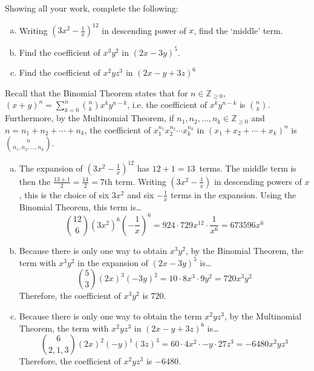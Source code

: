 \documentclass[11pt,letterpaper]{article}
\begin{document}

 Showing all your work, complete the following:
	\begin{enumerate}[(a)]
	\item Writing $\left(3x^2 - \frac{1}{x} \right)^{12}$ in descending power of $x$, find the `middle' term. 
	\item Find the coefficient of $x^3y^2$ in $(2x - 3y)^5$.
	\item Find the coefficient of $x^2yz^3$ in $(2x - y + 3z)^6$
	\end{enumerate} \pspace

\sol 

Recall that the Binomial Theorem states that for $n \in \mathbb{Z}_{\geq 0}$, $(x + y)^n= \sum_{k=0}^n \binom{n}{k} x^k y^{n - k}$, i.e. the coefficient of $x^k y^{n - k}$ is $\binom{n}{k}$. Furthermore, by the Multinomial Theorem, if $n_1, n_2, \ldots, n_k \in \mathbb{Z}_{\geq 0}$ and $n= n_1 + n_2 + \cdots + n_k$, the coefficient of $x_1^{n_1} x_2^{n_2} \cdots x_k^{n_k}$ in $(x_1 + x_2 + \cdots + x_k)^n$ is $\binom{n}{n_1, n_2, \ldots, n_k}$. 

\begin{enumerate}[(a)]
\item The expansion of $(3x^2 - \frac{1}{x})^{12}$ has $12 + 1= 13$~terms. The middle term is then the $\frac{13 + 1}{2}= \frac{14}{2}= 7$th term. Writing $(3x^2 - \frac{1}{x})$ in descending powers of $x$, this is the choice of six $3x^2$ and six $-\frac{1}{x}$ terms in the expansion. Using the Binomial Theorem, this term is\dots
	\[
	\binom{12}{6} (3x^2)^6 \left( -\dfrac{1}{x} \right)^6= 924 \cdot 729x^{12} \cdot \dfrac{1}{x^6}= 673596 x^6
	\] \pspace

\item Because there is only one way to obtain $x^3y^2$, by the Binomial Theorem, the term with $x^3y^2$ in the expansion of $(2x - 3y)^5$ is\dots
	\[
	\binom{5}{3} (2x)^3 (-3y)^2= 10 \cdot 8x^3 \cdot 9y^2= 720 x^3 y^2
	\]
Therefore, the coefficient of $x^3y^2$ is $720$. \pspace

\item Because there is only one way to obtain the term $x^2yz^3$, by the Multinomial Theorem, the term with $x^2yz^3$ in $(2x - y + 3z)^6$ is\dots
	\[
	\binom{6}{2, 1, 3} (2x)^2 (-y)^1 (3z)^3= 60 \cdot 4x^2 \cdot -y \cdot 27z^3= -6480 x^2yz^3
	\]
Therefore, the coefficient of $x^2yz^3$ is $-6480$. 
\end{enumerate}
\end{document}

